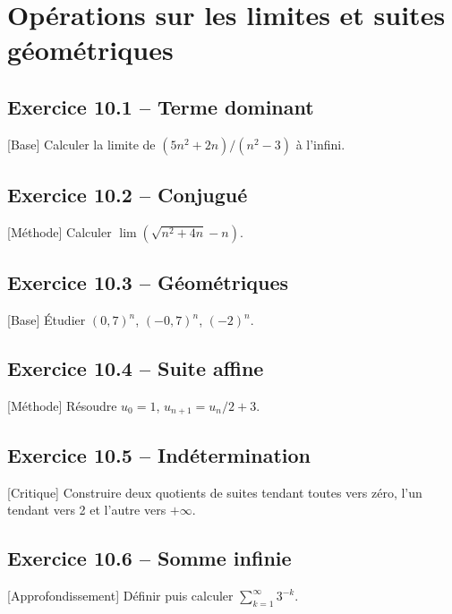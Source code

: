 \chapter{Opérations sur les limites et suites géométriques}
\section*{Exercice 10.1 -- Terme dominant}
[Base] Calculer la limite de $(5n^2+2n)/(n^2-3)$ à l'infini.

\section*{Exercice 10.2 -- Conjugué}
[Méthode] Calculer $\lim(\sqrt{n^2+4n}-n)$.

\section*{Exercice 10.3 -- Géométriques}
[Base] Étudier $(0{,}7)^n$, $(-0{,}7)^n$, $(-2)^n$.

\section*{Exercice 10.4 -- Suite affine}
[Méthode] Résoudre $u_0=1$, $u_{n+1}=u_n/2+3$.

\section*{Exercice 10.5 -- Indétermination}
[Critique] Construire deux quotients de suites tendant toutes vers zéro, l'un tendant vers 2 et l'autre vers $+\infty$.

\section*{Exercice 10.6 -- Somme infinie}
[Approfondissement] Définir puis calculer $\sum_{k=1}^{\infty}3^{-k}$.
